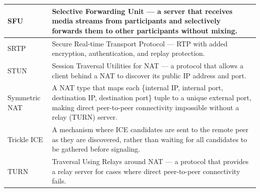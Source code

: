 \documentclass[11pt,letterpaper]{article}
\begin{document}
\begin{longtable}{L{3.5cm}L{12cm}}
\midrule
SFU & Selective Forwarding Unit --- a server that receives media streams from participants and selectively forwards them to other participants without mixing. \\
\midrule
SRTP & Secure Real-time Transport Protocol --- RTP with added encryption, authentication, and replay protection. \\
\midrule
STUN & Session Traversal Utilities for NAT --- a protocol that allows a client behind a NAT to discover its public IP address and port. \\
\midrule
Symmetric NAT & A NAT type that maps each \{internal IP, internal port, destination IP, destination port\} tuple to a unique external port, making direct peer-to-peer connectivity impossible without a relay (TURN) server. \\
\midrule
Trickle ICE & A mechanism where ICE candidates are sent to the remote peer as they are discovered, rather than waiting for all candidates to be gathered before signaling. \\
\midrule
TURN & Traversal Using Relays around NAT --- a protocol that provides a relay server for cases where direct peer-to-peer connectivity fails. \\
\bottomrule
\end{longtable}
\end{document}
